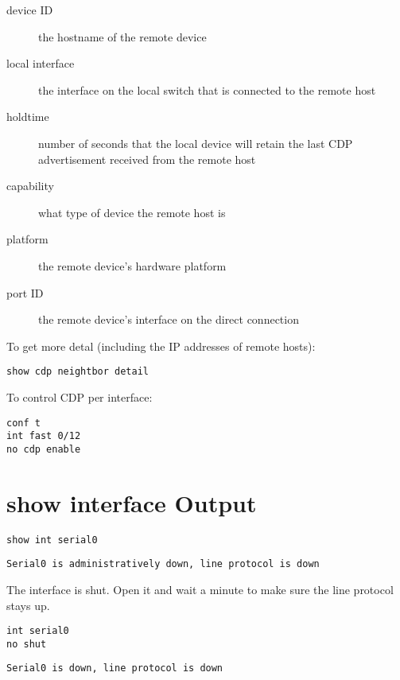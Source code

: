 \documentclass{article}
\begin{document}
\begin{description}

\item[device ID]
the hostname of the remote device

\item[local interface]
the interface on the local switch that is connected to the remote host

\item[holdtime]
number of seconds that the local device will retain the last CDP advertisement
received from the remote host

\item[capability]
what type of device the remote host is

\item[platform]
the remote device's hardware platform

\item[port ID]
the remote device's interface on the direct connection

\end{description}

To get more detal (including the IP addresses of remote hosts):

\begin{verbatim}
show cdp neightbor detail
\end{verbatim}

To control CDP per interface:

\begin{verbatim}
conf t
int fast 0/12
no cdp enable
\end{verbatim}

\section{show interface Output}

\begin{verbatim}
show int serial0
\end{verbatim}

\begin{verbatim}
Serial0 is administratively down, line protocol is down
\end{verbatim}

The interface is shut. Open it and wait a minute to make sure the line protocol
stays up.

\begin{verbatim}
int serial0
no shut
\end{verbatim}

\begin{verbatim}
Serial0 is down, line protocol is down
\end{verbatim}
\end{document}
